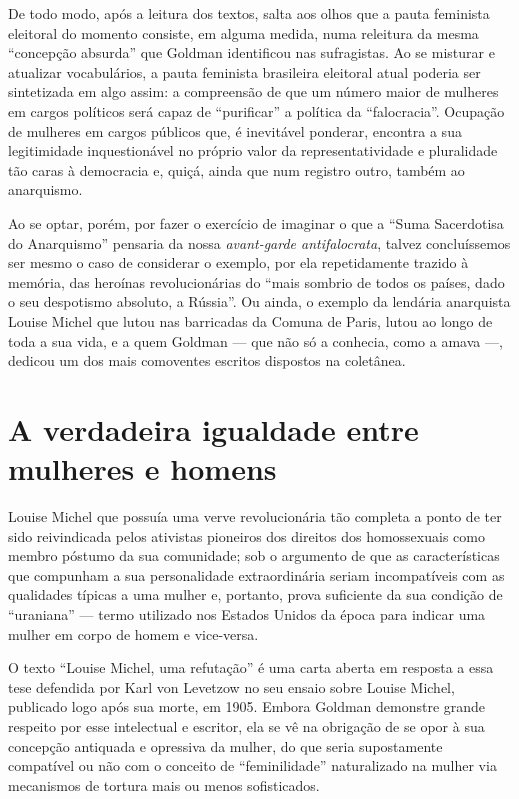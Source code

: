 De todo modo, após a leitura dos textos,
salta aos olhos que a pauta feminista eleitoral do
momento consiste, em alguma medida, numa releitura da mesma ``concepção
absurda'' que Goldman identificou nas sufragistas. Ao se misturar e
atualizar vocabulários, a pauta feminista brasileira eleitoral atual poderia ser sintetizada em algo assim: a compreensão de
que um número maior de mulheres em cargos políticos será capaz de
``purificar'' a política da ``falocracia''. Ocupação de mulheres em
cargos públicos que, é inevitável ponderar, encontra a sua legitimidade
inquestionável no próprio valor da representatividade e pluralidade tão
caras à democracia e, quiçá, ainda que num registro outro, também ao
anarquismo.

Ao se optar, porém, por fazer o exercício de imaginar o
que a ``Suma Sacerdotisa do Anarquismo'' pensaria da nossa
\emph{avant-garde antifalocrata}, talvez concluíssemos ser mesmo o
caso de considerar o exemplo, por ela repetidamente trazido à memória,
das heroínas revolucionárias do ``mais sombrio de todos os países, dado
o seu despotismo absoluto, a Rússia''. Ou ainda, o exemplo da lendária
anarquista Louise Michel que lutou nas barricadas da Comuna de Paris,
lutou ao longo de toda a sua vida, e a quem Goldman --- que não só a
conhecia, como a amava ---, dedicou um dos mais comoventes escritos
dispostos na coletânea.

\section{A verdadeira igualdade entre mulheres e homens}

Louise Michel que possuía uma verve
revolucionária tão completa a ponto de ter sido reivindicada pelos
ativistas pioneiros dos direitos dos homossexuais como membro póstumo da
sua comunidade; sob o argumento de que as características que compunham
a sua personalidade extraordinária seriam incompatíveis com as
qualidades típicas a uma mulher e, portanto, prova suficiente da sua
condição de ``uraniana'' --- termo utilizado nos Estados Unidos da época
para indicar uma mulher em corpo de homem e vice-versa.

O texto ``Louise
Michel, uma refutação'' é uma carta aberta em
resposta a essa tese defendida por Karl von Levetzow no seu ensaio sobre
Louise Michel, publicado logo após sua morte, em 1905. Embora Goldman
demonstre grande respeito por esse intelectual e escritor, ela se vê na
obrigação de se opor à sua concepção antiquada e opressiva da mulher, do
que seria supostamente compatível ou não com o conceito de
``feminilidade'' naturalizado na mulher via mecanismos de tortura mais
ou menos sofisticados.

